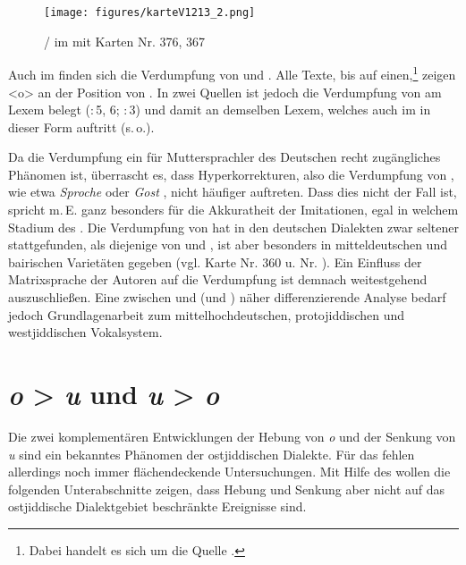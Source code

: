 \begin{figure}[h!]
		\centering
\texttt{[image: figures/karteV1213\_2.png]}
		\caption{\label{karteV1213}  / im  mit  Karten Nr. 376, 367}
		\end{figure}
\FloatBarrier

  
  
  
 Auch im  finden sich die Verdumpfung von  und . Alle Texte, bis auf einen,\footnote{Dabei handelt es sich um die Quelle .}  zeigen <o> an der Position von . In zwei Quellen ist jedoch die Verdumpfung von  am Lexem  belegt (:\,5, 6; :\,3) und damit an demselben Lexem, welches auch im   in dieser Form auftritt (s.\,o.). 
 
 
 Da die Verdumpfung ein für Muttersprachler des Deutschen recht zugängliches Phänomen ist, überrascht es, dass Hyperkorrekturen, also die Verdumpfung von , wie etwa \textit{Sproche}  oder \textit{Gost} , nicht häufiger auftreten. Dass dies nicht der Fall ist, spricht m.\,E. ganz besonders für die Akkuratheit der Imitationen, egal in welchem Stadium des . Die Verdumpfung von  hat in den deutschen Dialekten zwar seltener stattgefunden, als diejenige von  und , ist aber besonders in mitteldeutschen und bairischen Varietäten gegeben (vgl.  Karte Nr. 360   u.  Nr. ). Ein Einfluss der Matrixsprache der Autoren auf die Verdumpfung ist demnach weitestgehend auszuschließen. Eine zwischen  und  (und ) näher differenzierende Analyse bedarf jedoch Grundlagenarbeit zum mittelhochdeutschen, protojiddischen und westjiddischen Vokalsystem.\\
  
   
  
 \section{\textit{o} > \textit{u} und \textit{u} > \textit{o}}\label{o_u_zeug}

Die zwei komplementären Entwicklungen der Hebung von \textit{o} und der Senkung von \textit{u} sind ein bekanntes Phänomen der ostjiddischen Dialekte. Für das  fehlen allerdings noch immer flächendeckende Untersuchungen. Mit Hilfe des  wollen die folgenden Unterabschnitte zeigen, dass Hebung und Senkung aber nicht auf das ostjiddische Dialektgebiet beschränkte Ereignisse sind.\\


